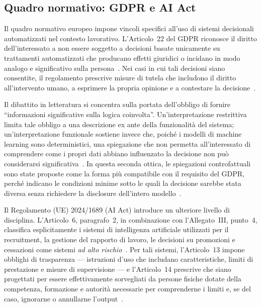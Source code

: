 \subsection{Quadro normativo: GDPR e AI Act}

Il quadro normativo europeo impone vincoli specifici all'uso di sistemi decisionali automatizzati nel contesto lavorativo. L'Articolo~22 del GDPR riconosce il diritto dell'interessato a non essere soggetto a decisioni basate unicamente su trattamenti automatizzati che producano effetti giuridici o incidano in modo analogo e significativo sulla persona~\cite{GDPR_Art22}. Nei casi in cui tali decisioni siano consentite, il regolamento prescrive misure di tutela che includono il diritto all'intervento umano, a esprimere la propria opinione e a contestare la decisione~\cite{goodman2017eu}.

Il dibattito in letteratura si concentra sulla portata dell'obbligo di fornire ``informazioni significative sulla logica coinvolta''. Un'interpretazione restrittiva limita tale obbligo a una descrizione ex ante della funzionalità del sistema; un'interpretazione funzionale sostiene invece che, poiché i modelli di machine learning sono deterministici, una spiegazione che non permetta all'interessato di comprendere come i propri dati abbiano influenzato la decisione non può considerarsi significativa~\cite{selbst2017meaningful}. In questa seconda ottica, le spiegazioni controfattuali sono state proposte come la forma più compatibile con il requisito del GDPR, perché indicano le condizioni minime sotto le quali la decisione sarebbe stata diversa senza richiedere la disclosure dell'intero modello~\cite{wachter2017counterfactual}.

Il Regolamento (UE) 2024/1689 (AI Act) introduce un ulteriore livello di disciplina. L'Articolo~6, paragrafo~2, in combinazione con l'Allegato~III, punto~4, classifica esplicitamente i sistemi di intelligenza artificiale utilizzati per il recruitment, la gestione del rapporto di lavoro, le decisioni su promozioni e cessazioni come sistemi \emph{ad alto rischio}~\cite{EU_AI_Act_2024}. Per tali sistemi, l'Articolo~13 impone obblighi di trasparenza --- istruzioni d'uso che includano caratteristiche, limiti di prestazione e misure di supervisione --- e l'Articolo~14 prescrive che siano progettati per essere effettivamente sorvegliati da persone fisiche dotate della competenza, formazione e autorità necessarie per comprenderne i limiti e, se del caso, ignorarne o annullarne l'output~\cite{EU_AI_Act_2024}.


